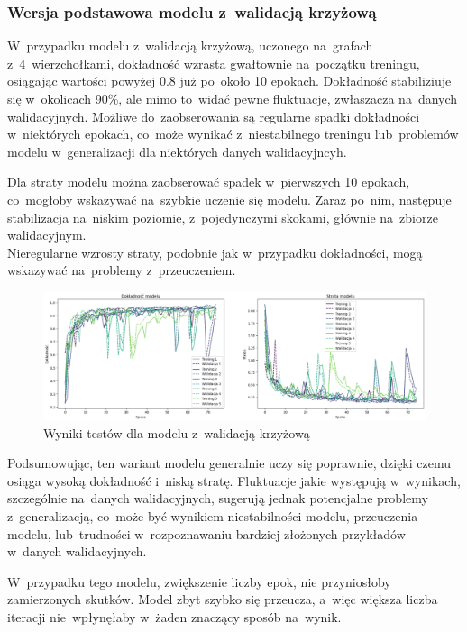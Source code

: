 \subsubsection{Wersja podstawowa modelu z~walidacją krzyżową}

W~przypadku modelu z~walidacją krzyżową, uczonego na~grafach z~4~wierzchołkami,
dokładność wzrasta gwałtownie na~początku treningu,
osiągając wartości powyżej 0.8 już po~około 10 epokach.
Dokładność stabiliziuje się w~okolicach 90\%, ale mimo to~widać pewne fluktuacje, zwłaszacza na~danych walidacyjnych.
Możliwe do~zaobserowania są regularne spadki dokładności w~niektórych epokach,
co~może wynikać z~niestabilnego treningu lub~problemów modelu w~generalizacji dla niektórych danych walidacyjncyh.

Dla straty modelu można zaobserować spadek w~pierwszych 10 epokach, co~mogłoby wskazywać na~szybkie uczenie się modelu.
Zaraz po~nim, następuje stabilizacja na~niskim poziomie, z~pojedynczymi skokami, głównie na~zbiorze walidacyjnym. \\
Nieregularne wzrosty straty, podobnie jak w~przypadku dokładności, mogą wskazywać na~problemy z~przeuczeniem.

\begin{figure}[ht]
	\centering
	\includegraphics[width=15.5cm]{resources/tests/images/v3/crossvalid_img.png}
	\caption{Wyniki testów dla modelu z~walidacją krzyżową}
	\label{Fig:tests-cv-0a}
\end{figure}
\FloatBarrier

Podsumowując, ten wariant modelu generalnie uczy się poprawnie, dzięki czemu osiąga wysoką dokładność i~niską stratę.
Fluktuacje jakie występują w~wynikach, szczególnie na~danych walidacyjnych,
sugerują jednak potencjalne problemy z~generalizacją, co~może być wynikiem niestabilności modelu,
przeuczenia modelu, lub~trudności w~rozpoznawaniu bardziej złożonych przykładów w~danych walidacyjnych.

W~przypadku tego modelu, zwiększenie liczby epok, nie przyniosłoby zamierzonych skutków.
Model zbyt szybko się przeucza, a~więc większa liczba iteracji nie~wpłynęłaby w~żaden znaczący sposób na~wynik.

